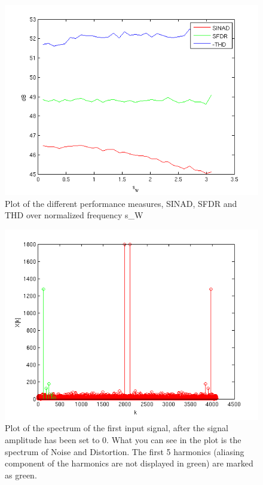 \begin{figure}[h!]
 \centering
 \includegraphics[width=\textwidth]{./pics/snrplots.png}
 \caption{Plot of the different performance measures, SINAD, SFDR and THD over normalized frequency s\_W}
 \label{fig:snrplots}
\end{figure}


\begin{figure}[h!]
 \centering
 \includegraphics[width=\textwidth]{./pics/spectrum.png}
 \caption{Plot of the spectrum of the first input signal, after the signal amplitude has been
 set to 0. What you can see in the plot is the spectrum of Noise and Distortion. The
 first 5 harmonics (aliasing component of the harmonics are not displayed in green) are marked as green.}
 \label{fig:spectrum}
\end{figure}


